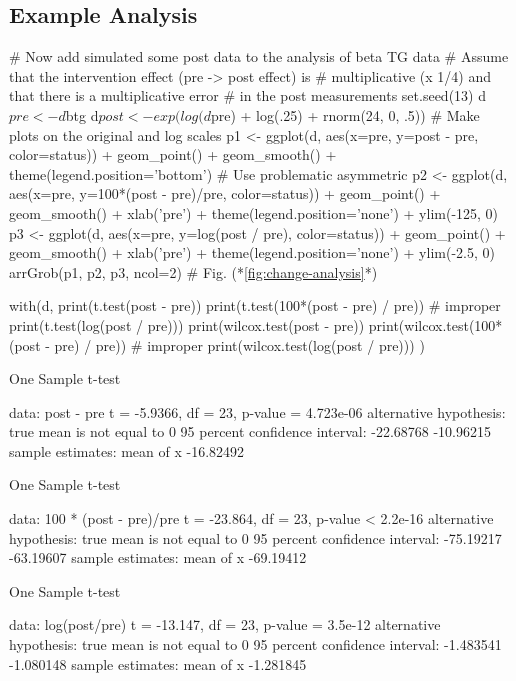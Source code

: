 \subsection{Example Analysis}
\begin{Schunk}
\begin{Sinput}
# Now add simulated some post data to the analysis of beta TG data
# Assume that the intervention effect (pre -> post effect) is
# multiplicative (x 1/4) and that there is a multiplicative error
# in the post measurements
set.seed(13)
d$pre  <- d$btg
d$post <- exp(log(d$pre) + log(.25) + rnorm(24, 0, .5))
# Make plots on the original and log scales
p1 <- ggplot(d, aes(x=pre, y=post - pre, color=status)) +
  geom_point() + geom_smooth() + theme(legend.position='bottom')
# Use problematic asymmetric %
p2 <- ggplot(d, aes(x=pre, y=100*(post - pre)/pre,
                    color=status)) + geom_point() + geom_smooth() +
      xlab('pre') + theme(legend.position='none') +
      ylim(-125, 0)
p3 <- ggplot(d, aes(x=pre, y=log(post / pre),
                    color=status)) + geom_point() + geom_smooth() +
      xlab('pre') + theme(legend.position='none') + ylim(-2.5, 0)
arrGrob(p1, p2, p3, ncol=2)   # Fig. (*\ref{fig:change-analysis}*)
\end{Sinput}
\begin{Sinput}
with(d, {
     print(t.test(post - pre))
     print(t.test(100*(post - pre) / pre))       # improper
     print(t.test(log(post / pre)))
     print(wilcox.test(post - pre))
     print(wilcox.test(100*(post - pre) / pre))  # improper
     print(wilcox.test(log(post / pre)))
     } )
\end{Sinput}
\begin{Soutput}

	One Sample t-test

data:  post - pre
t = -5.9366, df = 23, p-value = 4.723e-06
alternative hypothesis: true mean is not equal to 0
95 percent confidence interval:
 -22.68768 -10.96215
sample estimates:
mean of x 
-16.82492 


	One Sample t-test

data:  100 * (post - pre)/pre
t = -23.864, df = 23, p-value < 2.2e-16
alternative hypothesis: true mean is not equal to 0
95 percent confidence interval:
 -75.19217 -63.19607
sample estimates:
mean of x 
-69.19412 


	One Sample t-test

data:  log(post/pre)
t = -13.147, df = 23, p-value = 3.5e-12
alternative hypothesis: true mean is not equal to 0
95 percent confidence interval:
 -1.483541 -1.080148
sample estimates:
mean of x 
-1.281845 



\end{Soutput}
\end{Schunk}
